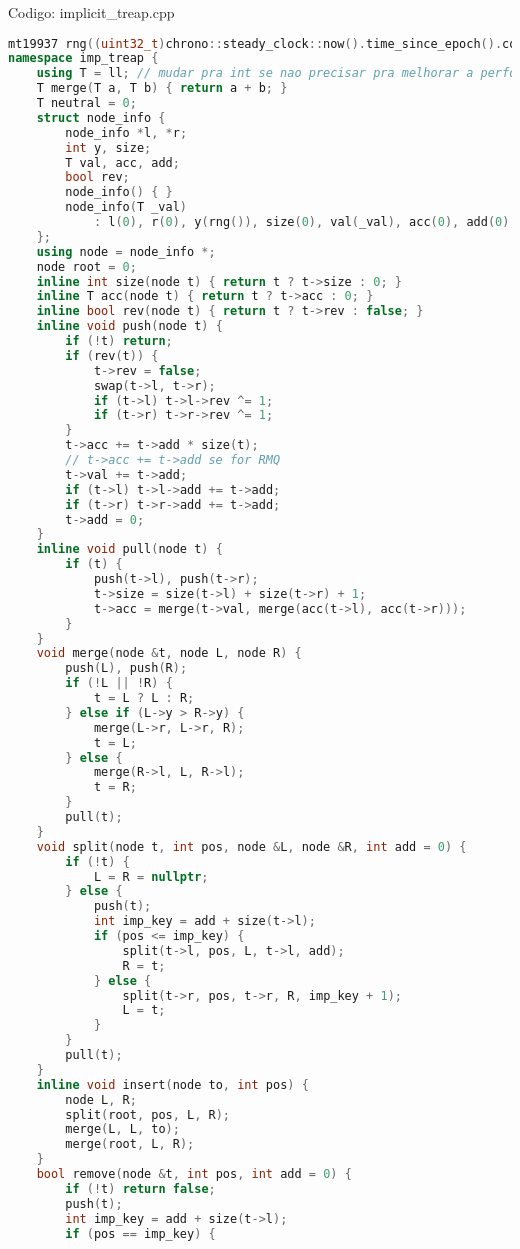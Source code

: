 \documentclass[10pt, a4paper, oneside]{book}
\begin{document}
\hfill

Codigo: implicit\_treap.cpp

\begin{lstlisting}[language=C++]
mt19937 rng((uint32_t)chrono::steady_clock::now().time_since_epoch().count());
namespace imp_treap {
    using T = ll; // mudar pra int se nao precisar pra melhorar a performance
    T merge(T a, T b) { return a + b; }
    T neutral = 0;
    struct node_info {
        node_info *l, *r;
        int y, size;
        T val, acc, add;
        bool rev;
        node_info() { }
        node_info(T _val)
            : l(0), r(0), y(rng()), size(0), val(_val), acc(0), add(0), rev(false) { }
    };
    using node = node_info *;
    node root = 0;
    inline int size(node t) { return t ? t->size : 0; }
    inline T acc(node t) { return t ? t->acc : 0; }
    inline bool rev(node t) { return t ? t->rev : false; }
    inline void push(node t) {
        if (!t) return;
        if (rev(t)) {
            t->rev = false;
            swap(t->l, t->r);
            if (t->l) t->l->rev ^= 1;
            if (t->r) t->r->rev ^= 1;
        }
        t->acc += t->add * size(t);
        // t->acc += t->add se for RMQ
        t->val += t->add;
        if (t->l) t->l->add += t->add;
        if (t->r) t->r->add += t->add;
        t->add = 0;
    }
    inline void pull(node t) {
        if (t) {
            push(t->l), push(t->r);
            t->size = size(t->l) + size(t->r) + 1;
            t->acc = merge(t->val, merge(acc(t->l), acc(t->r)));
        }
    }
    void merge(node &t, node L, node R) {
        push(L), push(R);
        if (!L || !R) {
            t = L ? L : R;
        } else if (L->y > R->y) {
            merge(L->r, L->r, R);
            t = L;
        } else {
            merge(R->l, L, R->l);
            t = R;
        }
        pull(t);
    }
    void split(node t, int pos, node &L, node &R, int add = 0) {
        if (!t) {
            L = R = nullptr;
        } else {
            push(t);
            int imp_key = add + size(t->l);
            if (pos <= imp_key) {
                split(t->l, pos, L, t->l, add);
                R = t;
            } else {
                split(t->r, pos, t->r, R, imp_key + 1);
                L = t;
            }
        }
        pull(t);
    }
    inline void insert(node to, int pos) {
        node L, R;
        split(root, pos, L, R);
        merge(L, L, to);
        merge(root, L, R);
    }
    bool remove(node &t, int pos, int add = 0) {
        if (!t) return false;
        push(t);
        int imp_key = add + size(t->l);
        if (pos == imp_key) {

\end{lstlisting}
\end{document}
